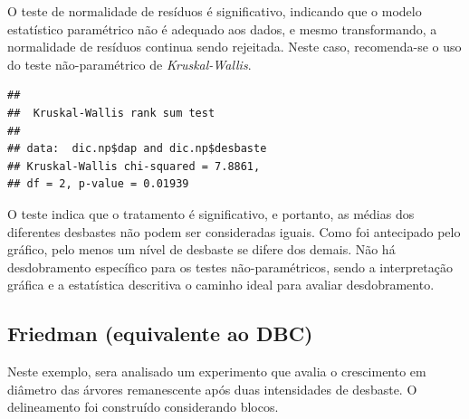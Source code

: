 \documentclass[
]{article}
\newenvironment{Shaded}{\begin{snugshade}}{\end{snugshade}}
\newcommand{\KeywordTok}[1]{\textcolor[rgb]{0.13,0.29,0.53}{\textbf{#1}}}
\newcommand{\NormalTok}[1]{#1}
\newcommand{\OperatorTok}[1]{\textcolor[rgb]{0.81,0.36,0.00}{\textbf{#1}}}
\begin{document}
O teste de normalidade de resíduos é significativo, indicando que o modelo estatístico paramétrico não é adequado aos dados, e mesmo transformando, a normalidade de resíduos continua sendo rejeitada. Neste caso, recomenda-se o uso do teste não-paramétrico de \emph{Kruskal-Wallis}.

\begin{Shaded}
\end{Shaded}

\begin{verbatim}
## 
##  Kruskal-Wallis rank sum test
## 
## data:  dic.np$dap and dic.np$desbaste
## Kruskal-Wallis chi-squared = 7.8861,
## df = 2, p-value = 0.01939
\end{verbatim}

O teste indica que o tratamento é significativo, e portanto, as médias dos diferentes desbastes não podem ser consideradas iguais. Como foi antecipado pelo gráfico, pelo menos um nível de desbaste se difere dos demais. Não há desdobramento específico para os testes não-paramétricos, sendo a interpretação gráfica e a estatística descritiva o caminho ideal para avaliar desdobramento.

\hypertarget{friedman-equivalente-ao-dbc}{%
\subsection{Friedman (equivalente ao DBC)}\label{friedman-equivalente-ao-dbc}}

Neste exemplo, sera analisado um experimento que avalia o crescimento em diâmetro das árvores remanescente após duas intensidades de desbaste. O delineamento foi construído considerando blocos.
\end{document}
